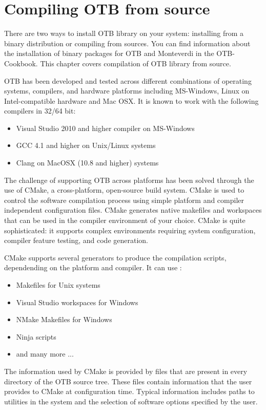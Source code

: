 \setcounter{secnumdepth}{3}

\chapter{Compiling OTB from source}
\label{chapter:Installation}

There are two ways to install OTB library on your system: installing from a binary distribution or compiling from sources. 
You can find information about the installation of binary packages for OTB and Monteverdi in the OTB-Cookbook.
This chapter covers compilation of OTB library from source.

OTB has been developed and tested across different combinations of operating systems, compilers, and hardware platforms including MS-Windows, Linux on Intel-compatible hardware and Mac OSX.  It is known to work with the following compilers in 32/64 bit:
\begin{itemize}
\item Visual Studio 2010 and higher compiler on MS-Windows
\item GCC 4.1 and higher on Unix/Linux systems
\item Clang on MacOSX (10.8 and higher) systems
\end{itemize}

The challenge of supporting OTB across platforms has been solved through the use of CMake, a cross-platform, open-source
build system. CMake is used to control the software compilation process using simple platform and compiler independent
configuration files.  CMake generates native makefiles and workspaces that can be used in the compiler environment of
your choice. CMake is quite sophisticated: it supports complex environments requiring system configuration, compiler
feature testing, and code generation.

CMake supports several generators to produce the compilation scripts, dependending on the platform and compiler. It can use :
\begin{itemize}
\item Makefiles for Unix systems
\item Visual Studio workspaces for Windows
\item NMake Makefiles for Windows
\item Ninja scripts
\item and many more ...
\end{itemize}
The information used by CMake is provided by  files that
are present in every directory of the OTB source tree. These files contain information that the user provides to CMake
at configuration time. Typical information includes paths to utilities in the system and the selection of software
options specified by the user.


